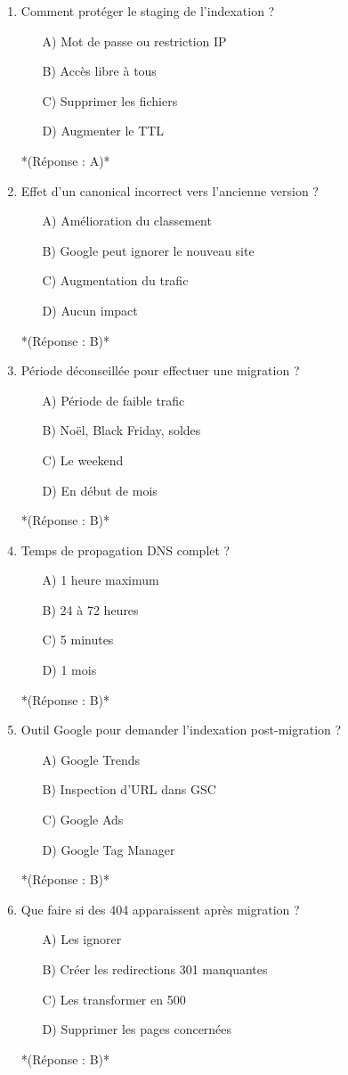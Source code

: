 \documentclass[12pt,a4paper,twoside]{report}
\begin{document}
\begin{enumerate}
\item Comment protéger le staging de l'indexation ?
\begin{itemize}
\item[A)] Mot de passe ou restriction IP
\item[B)] Accès libre à tous
\item[C)] Supprimer les fichiers
\item[D)] Augmenter le TTL
\end{itemize}
*(Réponse : A)*

\item Effet d'un canonical incorrect vers l'ancienne version ?
\begin{itemize}
\item[A)] Amélioration du classement
\item[B)] Google peut ignorer le nouveau site
\item[C)] Augmentation du trafic
\item[D)] Aucun impact
\end{itemize}
*(Réponse : B)*

\item Période déconseillée pour effectuer une migration ?
\begin{itemize}
\item[A)] Période de faible trafic
\item[B)] Noël, Black Friday, soldes
\item[C)] Le weekend
\item[D)] En début de mois
\end{itemize}
*(Réponse : B)*

\item Temps de propagation DNS complet ?
\begin{itemize}
\item[A)] 1 heure maximum
\item[B)] 24 à 72 heures
\item[C)] 5 minutes
\item[D)] 1 mois
\end{itemize}
*(Réponse : B)*

\item Outil Google pour demander l'indexation post-migration ?
\begin{itemize}
\item[A)] Google Trends
\item[B)] Inspection d'URL dans GSC
\item[C)] Google Ads
\item[D)] Google Tag Manager
\end{itemize}
*(Réponse : B)*

\item Que faire si des 404 apparaissent après migration ?
\begin{itemize}
\item[A)] Les ignorer
\item[B)] Créer les redirections 301 manquantes
\item[C)] Les transformer en 500
\item[D)] Supprimer les pages concernées
\end{itemize}
*(Réponse : B)*
\end{enumerate}
\end{document}
